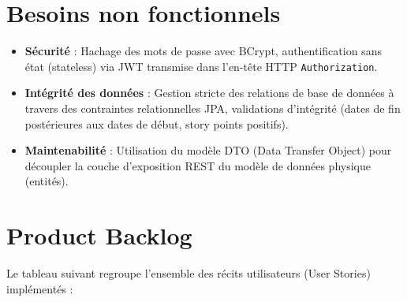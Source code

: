 \documentclass[12pt,a4paper]{report}
\begin{document}
\section{Besoins non fonctionnels}

\begin{itemize}
\item \textbf{Sécurité} : Hachage des mots de passe avec BCrypt, authentification sans état (stateless) via JWT transmise dans l'en-tête HTTP \verb|Authorization|.
\item \textbf{Intégrité des données} : Gestion stricte des relations de base de données à travers des contraintes relationnelles JPA, validations d'intégrité (dates de fin postérieures aux dates de début, story points positifs).
\item \textbf{Maintenabilité} : Utilisation du modèle DTO (Data Transfer Object) pour découpler la couche d'exposition REST du modèle de données physique (entités).
\end{itemize}

\section{Product Backlog}

Le tableau suivant regroupe l'ensemble des récits utilisateurs (User Stories) implémentés :
\end{document}
